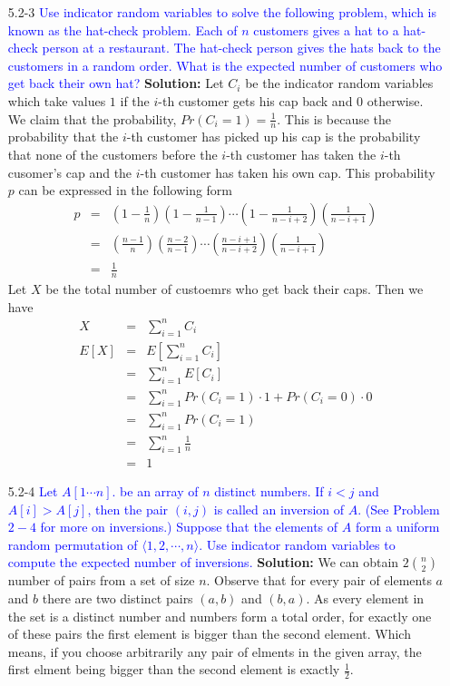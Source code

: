 \documentclass{article}
\begin{document}
\begin{enumerate}
\item[5.2-3] \textcolor{blue}{Use indicator random variables to solve the following problem, which is known as the hat-check problem. Each of $n$ customers gives a hat to a hat-check person at a restaurant. The hat-check person gives the hats back to the customers in a random
order. What is the expected number of customers who get back their own hat?}
\textbf{Solution:} Let $C_{i}$ be the indicator random variables which take values $1$ if the $i$-th customer gets his cap back and $0$ otherwise. We claim that the probability, $Pr(C_i = 1) = \frac{1}{n}$. This is because the probability that the $i$-th customer has picked up his cap is the probability that none of the customers before the $i$-th customer has taken the $i$-th cusomer's cap and the $i$-th customer has taken his own cap. This probability $p$ can be expressed in the following form
\begin{eqnarray*}
p &=& \left(1-\frac{1}{n}\right)\left(1-\frac{1}{n-1}\right)\cdots \left(1-\frac{1}{n-i+2}\right)\left(\frac{1}{n-i+1}\right)\\
&=& \left(\frac{n-1}{n}\right)\left(\frac{n-2}{n-1}\right)\cdots \left(\frac{n-i+1}{n-i+2}\right)\left(\frac{1}{n-i+1}\right)\\
&=& \frac{1}{n}
\end{eqnarray*}Let $X$ be the total number of custoemrs who get back their caps. Then we have
\begin{eqnarray*}
X &=& \sum_{i=1}^{n}C_i\\
E\left[X\right] &=& E[\sum_{i=1}^{n}C_i]\\
&=& \sum_{i=1}^{n}E\left[ C_i \right]\\
&=& \sum_{i=1}^{n}Pr(C_i=1) \cdot 1 + Pr(C_i=0) \cdot 0\\
&=& \sum_{i=1}^{n}Pr(C_i=1)\\
&=& \sum_{i=1}^{n}\frac{1}{n}\\
&=& 1
\end{eqnarray*}


\item[5.2-4] \textcolor{blue}{Let $A\left[1 \cdots n\right]$. be an array of $n$ distinct numbers. If $i < j$ and $A\left[i\right] > A\left[j\right]$, then the pair $\left(i,j\right)$ is called an inversion of $A$. (See Problem $2-4$ for more on inversions.) Suppose that the elements of $A$ form a uniform random permutation of $\langle 1, 2, \cdots ,n\rangle$. Use indicator random variables to compute the expected number of inversions.}
\textbf{Solution:} We can obtain $2\binom{n}{2}$ number of pairs from a set of size $n$. Observe that for every pair of elements $a$ and $b$ there are two distinct pairs $(a,b)$ and $(b,a)$. As every element in the set is a distinct number and numbers form a total order, for exactly one of these pairs the first element is bigger than the second element. Which means, if you choose arbitrarily any pair of elments in the given array, the first elment being bigger than the second element is exactly $\frac{1}{2}$. \\


\end{enumerate}
\end{document}

